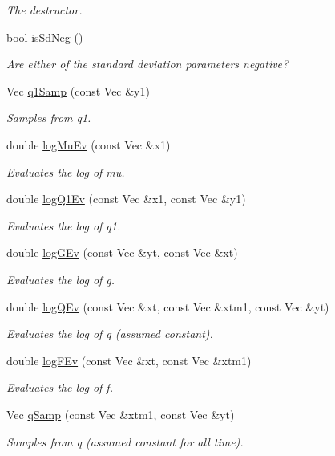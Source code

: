 \begin{DoxyCompactItemize}
\begin{DoxyCompactList}\small\item\em The destructor. \end{DoxyCompactList}\item 
bool \hyperlink{classNAr1Filter_aee9f60c01d44bb0e54092a04be1fbb1a}{is\+Sd\+Neg} ()
\begin{DoxyCompactList}\small\item\em Are either of the standard deviation parameters negative? \end{DoxyCompactList}\item 
Vec \hyperlink{classNAr1Filter_a6ae702c69b4f3e7b2109f99e2fd5d8b7}{q1\+Samp} (const Vec \&y1)
\begin{DoxyCompactList}\small\item\em Samples from q1. \end{DoxyCompactList}\item 
double \hyperlink{classNAr1Filter_ac97b366af3d4def2b45d394fb85865f0}{log\+Mu\+Ev} (const Vec \&x1)
\begin{DoxyCompactList}\small\item\em Evaluates the log of mu. \end{DoxyCompactList}\item 
double \hyperlink{classNAr1Filter_af8eb2b66ff1806dd0d4c4ac1f7129a51}{log\+Q1\+Ev} (const Vec \&x1, const Vec \&y1)
\begin{DoxyCompactList}\small\item\em Evaluates the log of q1. \end{DoxyCompactList}\item 
double \hyperlink{classNAr1Filter_aed4a7fb8160aabe9a7dc702826ccae60}{log\+G\+Ev} (const Vec \&yt, const Vec \&xt)
\begin{DoxyCompactList}\small\item\em Evaluates the log of g. \end{DoxyCompactList}\item 
double \hyperlink{classNAr1Filter_ae42e9ccf333b8590bd79831be8083dcd}{log\+Q\+Ev} (const Vec \&xt, const Vec \&xtm1, const Vec \&yt)
\begin{DoxyCompactList}\small\item\em Evaluates the log of q (assumed constant). \end{DoxyCompactList}\item 
double \hyperlink{classNAr1Filter_adff7d17aa5271b8df4c77d752a6fd773}{log\+F\+Ev} (const Vec \&xt, const Vec \&xtm1)
\begin{DoxyCompactList}\small\item\em Evaluates the log of f. \end{DoxyCompactList}\item 
Vec \hyperlink{classNAr1Filter_af4f7f8b643e5750dc83e27ea7bf05f18}{q\+Samp} (const Vec \&xtm1, const Vec \&yt)
\begin{DoxyCompactList}\small\item\em Samples from q (assumed constant for all time). \end{DoxyCompactList}\end{DoxyCompactItemize}


